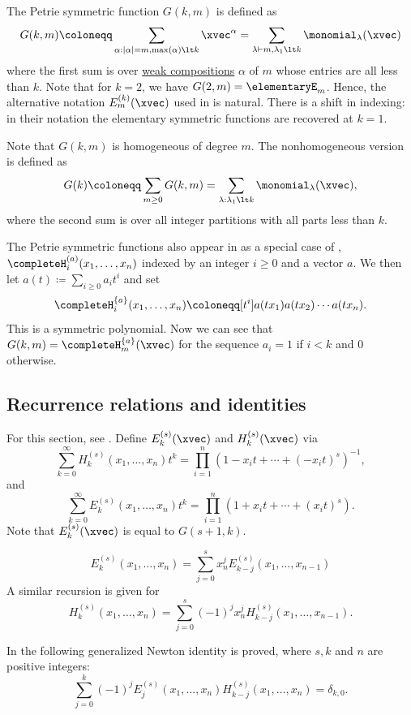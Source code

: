 The Petrie symmetric function $G(k,m)$ is defined as
\[
G(k,m) \coloneqq \sum_{\alpha : |\alpha|=m, \max(\alpha) \lt k} \xvec^{\alpha}
= \sum_{\lambda \vdash m, \lambda_1 \lt k}
\monomial_\lambda(\xvec)
\]
where the first sum is over
\hyperref[weakCompositionDefinition]{weak compositions} $\alpha$ of $m$ whose
entries are all less than $k$.
Note that for $k=2$, we have $G(2,m)=\elementaryE_m$.
Hence, the alternative notation $E^{(k)}_m(\xvec)$ used in
\cite{BazeniarAhmiaBelbachir2018,AhmiaMerca2020x} is natural.  There is a
shift in indexing: in their notation the elementary symmetric functions are
recovered at $k=1$.


Note that $G(k,m)$ is homogeneous of degree $m$.
The nonhomogeneous version is defined as
\[
G(k) \coloneqq \sum_{m \geq 0} G(k,m) = \sum_{\lambda : \lambda_1 \lt k} \monomial_\lambda(\xvec),
\]
where the second sum is over all integer partitions with all parts less than
$k$.


The Petrie symmetric functions also appear in \cite{Numata2007} as a special
case of ,
$\completeH^{(a)}_i(x_1,\dotsc,x_n)$ indexed by an integer $i\geq 0$ and a
vector $a$.
We then let $a(t)\coloneqq \sum_{i\geq 0} a_i t^i$ and set
\[
\completeH^{\{a\}}_i(x_1,\dotsc,x_n) \coloneqq
[t^i] a(t x_1) a(t x_2)\dotsm a(t x_n).
\]
This is a symmetric polynomial.
Now we can see that $G(k,m)=\completeH^{\{a\}}_m(\xvec)$ for the sequence
$a_i=1$ if $i \lt k$ and $0$ otherwise.


\subsection[petrieRecursion]{Recurrence relations and identities}

For this section, see \cite{BazeniarAhmiaBelbachir2018}.
Define $E^{(s)}_k(\xvec)$ and $H^{(s)}_k(\xvec)$ via
\[
  \sum_{k=0}^\infty H^{(s)}_k(x_1,\dotsc,x_n) t^k =
  \prod_{i=1}^n \left(  1-x_i t + \dotsb + (-x_i t)^s  \right)^{-1},
\]
and
\[
  \sum_{k=0}^\infty E^{(s)}_k(x_1,\dotsc,x_n) t^k =
  \prod_{i=1}^n \left(  1 + x_i t + \dotsb + (x_i t)^s  \right).
\]
Note that $E^{(s)}_k(\xvec)$ is equal to $G(s+1,k)$.

\[
E^{(s)}_k(x_1,\dotsc,x_n)
=
\sum_{j=0}^s x_n^j E^{(s)}_{k-j}(x_1,\dotsc,x_{n-1})
\]
A similar recursion is given for
\[
H^{(s)}_k(x_1,\dotsc,x_n)
=
\sum_{j=0}^s (-1)^j x_n^j H^{(s)}_{k-j}(x_1,\dotsc,x_{n-1}).
\]


In \cite{AhmiaMerca2020x} the following generalized Newton identity is proved,
where $s,k$ and $n$ are positive integers:
\[
   \sum_{j=0}^k (-1)^j
   E^{(s)}_j(x_1,\dotsc,x_n) H^{(s)}_{k-j}(x_1,\dotsc,x_n)
   =
   \delta_{k,0}.
\]

